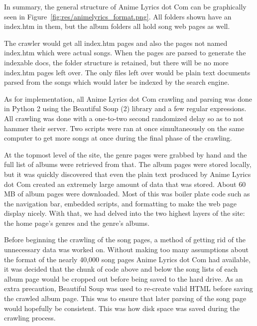 \documentclass{acm} %
\begin{document}
\begin{CJK}{UTF8}{zhsong}
In summary, the general structure of Anime Lyrics dot Com can be graphically seen in Figure~\ref{fig:res/animelyrics_format.png}. All folders shown have an index.htm in them, but the album folders all hold song web pages as well.


The crawler would get all index.htm pages and also the pages not named index.htm which were actual songs. When the pages are parsed to generate the indexable docs, the folder structure is retained, but there will be no more index.htm pages left over. The only files left over would be plain text documents parsed from the songs which would later be indexed by the search engine.

As for implementation, all Anime Lyrics dot Com crawling and parsing was done in Python 2 using the Beautiful Soup (2) library and a few regular expressions. All crawling was done with a one-to-two second randomized delay so as to not hammer their server. Two scripts were ran at once simultaneously on the same computer to get more songs at once during the final phase of the crawling.

At the topmost level of the site, the genre pages were grabbed by hand and the full list of albums were retrieved from that. The album pages were stored locally, but it was quickly discovered that even the plain text produced by Anime Lyrics dot Com created an extremely large amount of data that was stored. About 60 MB of album pages were downloaded. Most of this was boiler plate code such as the navigation bar, embedded scripts, and formatting to make the web page display nicely. With that, we had delved into the two highest layers of the site: the home page's genres and the genre's albums.

Before beginning the crawling of the song pages, a method of getting rid of the unnecessary data was worked on. Without making too many assumptions about the format of the nearly 40,000 song pages Anime Lyrics dot Com had available, it was decided that the chunk of code above and below the song lists of each album page would be cropped out before being saved to the hard drive. As an extra precaution, Beautiful Soup was used to re-create valid HTML before saving the crawled album page. This was to ensure that later parsing of the song page would hopefully be consistent. This was how disk space was saved during the crawling process.


\end{CJK}
\end{document}
